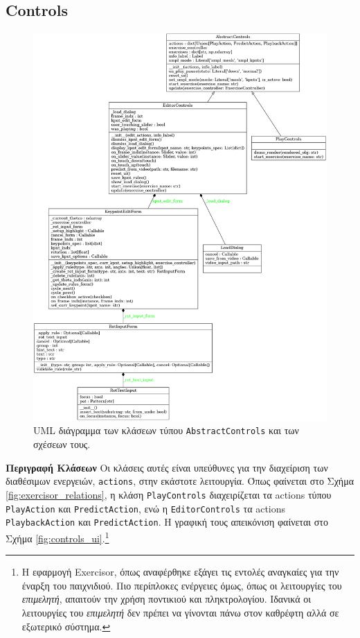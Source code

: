 \subsection{Controls}
\label{sec:abstract_controls}

\begin{figure}[H]
	\centering
	\includegraphics[scale=0.26]{images/chapter5/controls.png}
	\caption{UML διάγραμμα των κλάσεων τύπου \texttt{AbstractControls} και των σχέσεων τους.}
	\label{fig:controls}
\end{figure}

\noindent\textbf{Περιγραφή Κλάσεων}
Οι κλάσεις αυτές είναι υπεύθυνες για την διαχείριση των διαθέσιμων ενεργειών, \texttt{actions}, στην εκάστοτε λειτουργία. Όπως φαίνεται στο Σχήμα \ref{fig:exercisor_relations}, η κλάση \texttt{PlayControls} διαχειρίζεται τα actions τύπου \texttt{PlayAction} και \texttt{PredictAction}, ενώ η \texttt{EditorControls} τα actions \texttt{PlaybackAction} και \texttt{PredictAction}. Η γραφική τους απεικόνιση φαίνεται στο Σχήμα \ref{fig:controls_ui}.\footnote{Η εφαρμογή Exercisor, όπως αναφέρθηκε εξάγει τις εντολές αναγκαίες για την έναρξη του παιχνιδιού. Πιο περίπλοκες ενέργειες όμως, όπως οι λειτουργίες του \textsl{επιμελητή}, απαιτούν την χρήση ποντικιού και πληκτρολογίου. Ιδανικά οι λειτουργίες του \textsl{επιμελητή} δεν πρέπει να γίνονται πάνω στον καθρέφτη αλλά σε εξωτερικό σύστημα.}

